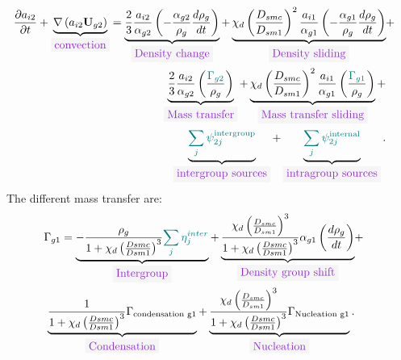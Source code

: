 \begin{equation}
\begin{aligned}
\frac{\partial a_{i2}}{\partial t}+\underbrace{\nabla\parent{a_{i2}\mathbf{U}_{g2}}}_{\colorbox{codebackground}{\color{codekeyword3} convection}}=\underbrace{\frac{2}{3}\frac{a_{i2}}{\alpha_{g2}}\parent{-\frac{\alpha_{g2}}{\rho_g}\frac{d \rho_g}{dt}}}_{\colorbox{codebackground}{\color{codekeyword3} Density\ change}}+\underbrace{\chi_d\parent{\frac{D_{smc}}{D_{sm1}}}^2\frac{a_{i1}}{\alpha_{g1}}\parent{-\frac{\alpha_{g1}}{\rho_g}\frac{d \rho_g}{dt}}}_{\colorbox{codebackground}{\color{codekeyword3} Density\ sliding}}&+ & \\
\underbrace{\frac{2}{3}\frac{a_{i2}}{\alpha_{g2}}\parent{\frac{\color{myteal}\Gamma_{g2}}{\rho_g}}}_{\colorbox{codebackground}{\color{codekeyword3} Mass\ transfer}} +\underbrace{\chi_d\parent{\frac{D_{smc}}{D_{sm1}}}^2\frac{a_{i1}}{\alpha_{g1}}\parent{\frac{\color{myteal}\Gamma_{g1}}{\rho_g} }}_{\colorbox{codebackground}{\color{codekeyword3} Mass\ transfer\ sliding}} +& \\ 
\underbrace{\color{myteal}\sum_j \psi^{\text{intergroup}}_{2j}}_{\colorbox{codebackground}{\color{codekeyword3} intergroup\ sources}}+\underbrace{\color{myteal}\sum_j \psi^{\text{internal}}_{2j}}_{\colorbox{codebackground}{\color{codekeyword3} intragroup sources}}.
\end{aligned}
\end{equation}
The different mass transfer are:
\begin{equation}
\begin{aligned}
\Gamma_{g1}=\underbrace{-\frac{\rho_g}{1+\chi_d \parent{\frac{Dsmc}{Dsm1}}^3}{\color{myteal}\sum_j \eta^{inter}_j}}_{\colorbox{codebackground}{\color{codekeyword3} Intergroup}}+ \underbrace{\frac{\chi_d\parent{\frac{D_{smc}}{D_{sm1}}}^3}{1+\chi_d \parent{\frac{Dsmc}{Dsm1}}^3}\alpha_{g1}\parent{\frac{d\rho_{g}}{dt}}}_{\colorbox{codebackground}{\color{codekeyword3} Density\ group\ shift}}&+& \\
\underbrace{\frac{1}{1+\chi_d \parent{\frac{Dsmc}{Dsm1}}^3}\Gamma_{\text{condensation g1}}}_{\colorbox{codebackground}{\color{codekeyword3} Condensation}}+\underbrace{\frac{\chi_d\parent{\frac{D_{smc}}{D_{sm1}}}^3}{1+\chi_d \parent{\frac{Dsmc}{Dsm1}}^3}\Gamma_{\text{Nucleation g1}}}_{\colorbox{codebackground}{\color{codekeyword3} Nucleation}}.
\end{aligned}
\end{equation}
